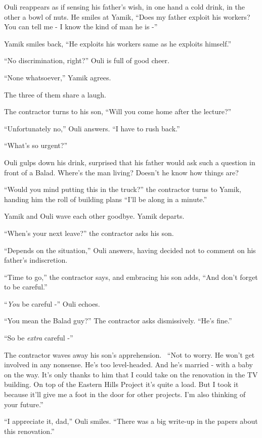 \documentclass[twoside,11pt]{book}
\begin{document}
Ouli reappears as if sensing his father's wish, in one hand a cold drink, in the other a bowl of nuts. He smiles at
Yamik, ``Does my father exploit his workers? You can tell me - I know the kind of man he is
-''

Yamik smiles back, ``He exploits his workers same as he exploits himself.''

``No discrimination, right?'' Ouli is full of good cheer.

``None whatsoever,'' Yamik agrees.

The three of them share a laugh.

The contractor turns to his son, ``Will you come home after the lecture?''

``Unfortunately no,'' Ouli answers. ``I have to rush back.''

``What's so urgent?''

Ouli gulps down his drink, surprised that his father would ask such a question in front of a Balad. Where's the man
living? Doesn't he know how things are? \

{}``Would you mind putting this in the truck?'' the contractor turns to Yamik, handing him the roll of building plans
``I'll be along in a minute.''

Yamik and Ouli wave each other goodbye. Yamik departs.

``When's your next leave?'' the contractor asks his son.

``Depends on the situation,'' Ouli answers, having decided not to comment on his father's
indiscretion.

``Time to go,'' the contractor says, and embracing his son adds, ``And don't
forget to be careful.''

``\textit{You} be careful -'' Ouli echoes.

``You mean the Balad guy?'' The contractor asks dismissively. ``He's
fine.''

``So be \textit{extra} careful -''

The contractor waves away his son's apprehension.~ ``Not to worry. He won't get involved in any nonsense.
He's too level-headed. And he's married - with a baby on the way. It's only thanks to him that I could take on the
renovation in the TV building. On top of the Eastern Hills Project it's quite a load. But I took it because it'll give
me a foot in the door for other projects. I'm also thinking of your future.''

``I appreciate it, dad,'' Ouli smiles. ``There was a big write-up in the papers
about this renovation.''
\end{document}
